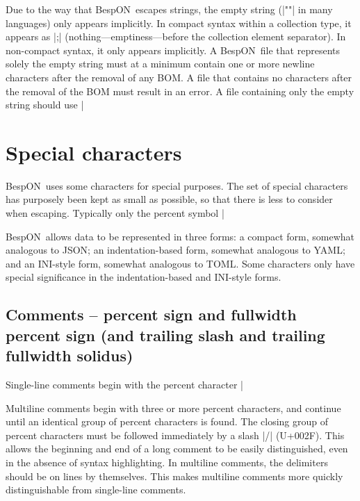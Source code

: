 \documentclass[11pt]{article}
\newcommand{\bespon}{BespON}
\begin{document}
Due to the way that \bespon\ escapes strings, the empty string (|""| in many languages) only appears implicitly.  In compact syntax within a collection type, it appears as |;| (nothing---emptiness---before the collection element separator).  In non-compact syntax, it only appears implicitly.  A \bespon\ file that represents solely the empty string must at a minimum contain one or more newline characters after the removal of any BOM.  A file that contains no characters after the removal of the BOM must result in an error.  A file containing only the empty string should use |%

\section{Special characters}


\bespon\ uses some characters for special purposes.  The set of special characters has purposely been kept as small as possible, so that there is less to consider when escaping.  Typically only the percent symbol |%

\bespon\ allows data to be represented in three forms:  a compact form, somewhat analogous to JSON; an indentation-based form, somewhat analogous to YAML; and an INI-style form, somewhat analogous to TOML.  Some characters only have special significance in the indentation-based and INI-style forms.


\subsection{Comments -- percent sign and fullwidth percent sign (and trailing slash and trailing fullwidth solidus)}

Single-line comments begin with the percent character |%

Multiline comments begin with three or more percent characters, and continue until an identical group of percent characters is found.  The closing group of percent characters must be followed immediately by a slash |/| (U+002F).  This allows the beginning and end of a long comment to be easily distinguished, even in the absence of syntax highlighting.  In multiline comments, the delimiters should be on lines by themselves.  This makes multiline comments more quickly distinguishable from single-line comments.
\end{document}
